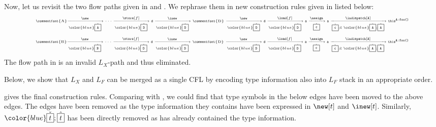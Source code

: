Now, let us revisit the two flow paths given in  and . We rephrase them in new \pag construction rules given in  listed below:
\begin{equation} \tiny
  \centering
\label{eq:newLFCPathCGOnFlyI}
\begin{tabular}{l} 
\commentfont{A}$\xrightarrow[{\color{blue} \hat{\boxed{\texttt{A}}}}]{\new} \cdots \xrightarrow[{\color{blue} \hat{\boxed{\texttt{D}}}}]{\store[f]} \texttt{d}
\xrightarrow[{\color{blue} \check{\boxed{\texttt{D}}}}]{\inew}$ \commentfont{D} 
$ \xrightarrow[{\color{blue} \hat{\boxed{\texttt{D}}}}]{\new} \texttt{d}
\xrightarrow[{\color{blue} \check{\boxed{\texttt{D}}}}]{\load[f]} \texttt{a}
\xrightarrow[\hat{\boxed{\mathtt{c}}}]{\assign} \texttt{a}
\xrightarrow[\check{\boxed{\mathtt{c}}};\hat{\mathtt{c}} \ {\color{blue} \check{\boxed{\texttt{A}}};\hat{\boxed{\texttt{A}}}}]{\indispatch[\texttt{A}]} \mathtt{this}^{\texttt{A:foo()}}$
\end{tabular}
\end{equation}
\begin{equation} \tiny
  \centering
\label{eq:newLFCPathCGOnFlyII}
\begin{tabular}{l} 
\commentfont{B}$\xrightarrow[{\color{blue} \hat{\boxed{\texttt{B}}}}]{\new} \cdots \xrightarrow[{\color{blue} \hat{\boxed{\texttt{D}}}}]{\store[f]} \texttt{d}
\xrightarrow[{\color{blue} \check{\boxed{\texttt{D}}}}]{\inew}$ \commentfont{D} 
$ \xrightarrow[{\color{blue} \hat{\boxed{\texttt{D}}}}]{\new} \texttt{d}
\xrightarrow[{\color{blue} \check{\boxed{\texttt{D}}}}]{\load[f]} \texttt{a}
\xrightarrow[\hat{\boxed{\mathtt{c}}}]{\assign} \texttt{a}
\xrightarrow[\check{\boxed{\mathtt{c}}};\hat{\mathtt{c}} \ {\color{blue} \check{\boxed{\texttt{A}}};\hat{\boxed{\texttt{A}}}}]{\indispatch[\texttt{A}]} \mathtt{this}^{\texttt{A:foo()}}$
\end{tabular}
\end{equation}
The flow path in  is an invalid $L_X$-path and thus eliminated. 

Below, we show that $L_X$ and $L_F$ can be merged as a single CFL by encoding type information also into $L_F$ stack in an appropriate order.

 gives the final \pag construction rules. Comparing with , we could find that type symbols in the below edges have been moved to the above edges. The \typefound[t] edges have 
been removed as the type information they contains have been expressed in $\new[t]$ and $\inew[t]$. Similarly, 
${\color{blue} \check{\boxed{t}};\hat{\boxed{t}}}$ has been directly removed as \indispatch[t] has already contained the type information. 

